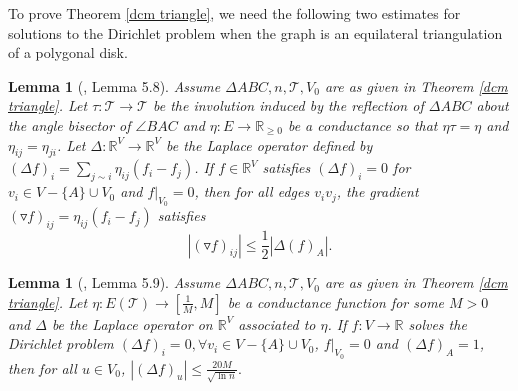 \documentclass[12pt]{amsart}
\newtheorem{lemma}[theorem]{Lemma}
\def\R{\mathbb{R}}
\def\T{\mathcal{T}}
\begin{document}
To prove Theorem \ref{dcm triangle}, we need the following two estimates for solutions to the Dirichlet problem when the graph is an equilateral triangulation of a polygonal disk.


\begin{lemma}[\cite{LSW}, Lemma 5.8] \label{estimate1}
	Assume $\Delta ABC,n,\mathcal T,V_0$ are as given in Theorem \ref{dcm triangle}.
	Let $\tau: \T \to \T$ be the involution
	induced by the reflection of $\Delta ABC$ about the angle bisector
	of $\angle BAC$ and $\eta: E \to \R_{\geq 0}$ be a conductance so
	that $\eta \tau =\eta$ and $\eta_{ij}=\eta_{ji}$. Let $\Delta:
	\R^V \to \R^V$ be the Laplace operator defined by $(\Delta f)_i
	=\sum_{ j \sim i} \eta_{ij}(f_i -f_j)$. If $f \in \R^V$ satisfies
	$(\Delta f)_i=0$ for $v_i \in V-\{A\}\cup V_0$ and $f|_{V_0}=0$,
	then for all edges $v_iv_j$, the gradient $(\triangledown
	f)_{ij}=\eta_{ij}(f_i-f_j)$ satisfies
	\begin{equation}\label{90e} |(\triangledown
	f)_{ij}| \leq
		\frac{1}{2}|\Delta(f)_A|.
	\end{equation}
\end{lemma}

\begin{lemma}[\cite{LSW}, Lemma 5.9] \label{estimate2}
	Assume $\Delta ABC,n,\mathcal T,V_0$ are as given in Theorem \ref{dcm triangle}.
	Let $\eta: E(\T) \to [\frac{1}{M}, M]$ be a conductance
	function  for some $M>0$ and  $\Delta$ be the Laplace operator on
	$\R^V$ associated to $\eta$. If $f:V \to \R$ solves the Dirichlet
	problem $(\Delta f)_i=0, \forall v_i \in V-\{A\}\cup V_0$,
	$f|_{V_0}=0$ and $(\Delta f )_A=1$, then for all $u \in V_0$,
	$|(\Delta f)_u|\leq \frac{20M}{\sqrt{\ln n}}.$
\end{lemma}
\end{document}
